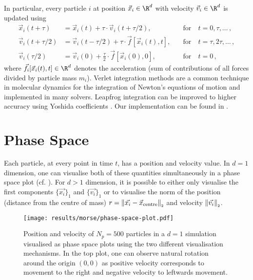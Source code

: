 In particular, every particle $i$ at position $\vec{x}_i \in \R^d$ with velocity $\vec{v}_i \in \R^d$ is updated using
\begin{align*}
  \vec{x}_i(t+\tau)     & = \vec{x}_i(t)+\tau \cdot \vec{v}_i(t+\tau / 2),              & \quad\text{for}~ & t=0, \tau, \ldots\,,      \\
  \vec{v}_i(t+\tau / 2) & = \vec{v}_i(t-\tau/2) + \tau \cdot \vec{f}[\vec{x}_i(t), t],  & \quad\text{for}~ & t=\tau, 2 \tau, \ldots\,, \\
  \vec{v}_i(\tau / 2)   & = \vec{v}_i(0)+\frac{\tau}{2} \cdot \vec{f}[\vec{x}_i(0), 0], & \quad\text{for}~ & t=0\,,
\end{align*}
where $\vec{f}_i[\vec{x}_i(t), t] \in \R^d$ denotes the acceleration (sum of contributions of all forces divided by particle mass $m_i$).
Verlet integration methods are a common technique in molecular dynamics for the integration of Newton's equations of motion and implemented in many solvers.
Leapfrog integration can be improved to higher accuracy using Yoshida coefficients \parencite{1973-yoshida-coefficients}.
Our implementation can be found in .


\section{Phase Space}
Each particle, at every point in time $t$, has a position and velocity value.
In $d=1$ dimension, one can visualise both of these quantities simultaneously in a phase space plot (cf. ).
For $d > 1$ dimension, it is possible to either only visualise the first components $\{\vec{x_i}\}_1$ and $\{\vec{v_i}\}_1$ or to visualise the norm of the position (distance from the centre of mass) $r = \left\lVert\vec{x_i} - \vec{x}_{\text{centre}}\right\rVert_{\scriptscriptstyle 2}$ and velocity $\left\lVert\vec{v_i}\right\rVert_{\scriptscriptstyle 2}$.

\begin{figure}[H]
  \centering
  \texttt{[image: results/morse/phase-space-plot.pdf]}
  \caption[Phase Space Plots]{Position and velocity of $N_p = 500$ particles in a $d=1$ simulation visualised as phase space plots using the two different visualisation mechanisms. In the top plot, one can observe natural rotation around the origin $(0, 0)$ as positive velocity corresponds to movement to the right and negative velocity to leftwards movement.}
  \label{fig:phase-space-plot}
\end{figure}

